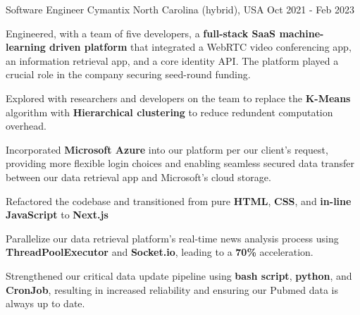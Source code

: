 \begin{cventries}
    \cventry
    {Software Engineer} %
    {Cymantix} %
    {North Carolina (hybrid), USA} %
    {Oct 2021 - Feb 2023} %
    {
      \begin{cvitems} %
        \item {Engineered, with a team of five developers, a \textbf{full-stack SaaS machine-learning driven platform} that integrated a WebRTC video conferencing app, an information retrieval app, and a core identity API. The platform played a crucial role in the company securing seed-round funding.}
        \item {Explored with researchers and developers on the team to replace the \textbf{K-Means} algorithm with \textbf{Hierarchical clustering} to reduce redundent computation overhead.}
        \item {Incorporated \textbf{Microsoft Azure} into our platform per our client's request, providing more flexible login choices and enabling seamless secured data transfer between our data retrieval app and Microsoft's cloud storage.}
        \item {Refactored the codebase and transitioned from pure \textbf{HTML}, \textbf{CSS}, and \textbf{in-line JavaScript} to \textbf{Next.js}}
        \item {Parallelize our data retrieval platform's real-time news analysis process using \textbf{ThreadPoolExecutor} and \textbf{Socket.io}, leading to a \textbf{70\%} acceleration.}
        \item {Strengthened our critical data update pipeline using \textbf{bash script}, \textbf{python}, and \textbf{CronJob}, resulting in increased reliability and ensuring our Pubmed data is always up to date.}
      \end{cvitems}
    }


\end{cventries}
